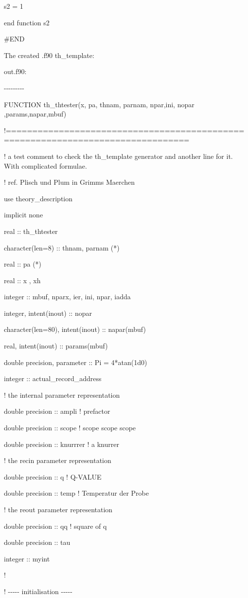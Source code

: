 \documentclass[]{article}
\begin{document}
s2 = 1

end function s2

\#END

The created .f90 th\_template:

out.f90:

-\/-\/-\/-\/-\/-\/-\/-\/-

FUNCTION th\_thtester(x, pa, thnam, parnam, npar,ini, nopar
,params,napar,mbuf)

!================================================================================

! a test comment to check the th\_template generator and another line
for it. With complicated formulae.

! ref. Plisch und Plum in Grimms Maerchen

use theory\_description

implicit none

real :: th\_thtester

character(len=8) :: thnam, parnam (*)

real :: pa (*)

real :: x , xh

integer :: mbuf, nparx, ier, ini, npar, iadda

integer, intent(inout) :: nopar

character(len=80), intent(inout) :: napar(mbuf)

real, intent(inout) :: params(mbuf)

double precision, parameter :: Pi = 4*atan(1d0)

integer :: actual\_record\_address

! the internal parameter representation

double precision :: ampli ! prefactor

double precision :: scope ! scope scope scope

double precision :: knurrrer ! a knurrer

! the recin parameter representation

double precision :: q ! Q-VALUE

double precision :: temp ! Temperatur der Probe

! the reout parameter representation

double precision :: qq ! square of q

double precision :: tau

integer :: myint

!

! -\/-\/-\/-\/- initialisation -\/-\/-\/-\/-
\end{document}

